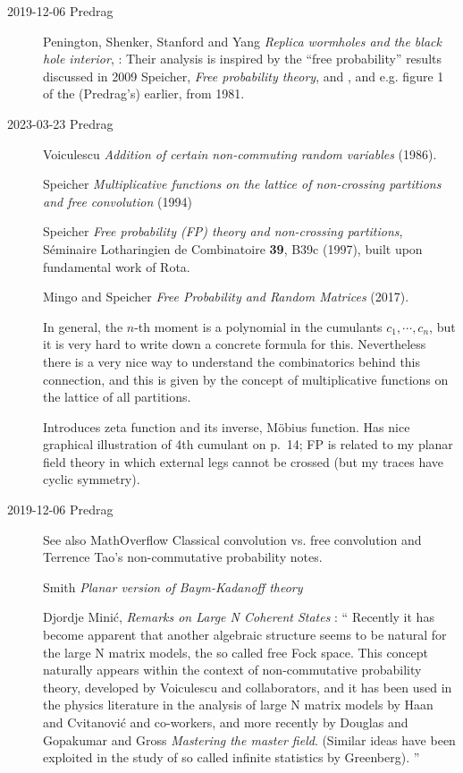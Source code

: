 \begin{description}
\item[2019-12-06 Predrag]
\label{post:PSSY19}
Penington, Shenker, Stanford and Yang
{\em Replica wormholes and the black hole interior},
:
Their analysis is inspired by the ``free probability'' results discussed
in 2009 Speicher, {\em Free probability theory},
 and , and e.g. figure 1 of the (Predrag's)
earlier, from 1981.

   \item[2023-03-23 Predrag]
Voiculescu
{\em Addition of certain non-commuting random variables} (1986).

Speicher {\em Multiplicative functions on the lattice of
non-crossing partitions and free convolution} (1994)

Speicher {\em Free probability (FP) theory and non-crossing partitions},
S{\'e}minaire Lotharingien de Combinatoire
     {{\bf 39}, B39c} (1997),
built upon fundamental work of Rota.

Mingo and Speicher
{\em Free Probability and Random Matrices} (2017).

In general, the $n$-th moment is a polynomial in the cumulants $c_1, \cdots ,
c_n$, but it is very hard to write down a concrete formula for this.
Nevertheless there is a very nice way to understand the combinatorics
behind this connection, and this is given by the concept of multiplicative
functions on the lattice of all partitions.

Introduces zeta function and its inverse, M{\"o}bius function. Has nice
graphical illustration of 4th cumulant on p.~14; FP is related to my planar
field theory in which external legs cannot be crossed (but my traces have
cyclic symmetry).


\item[2019-12-06 Predrag]
See also MathOverflow
{Classical convolution vs. free convolution}
and Terrence Tao's
{non-commutative probability} notes.

Smith {\em Planar version of {Baym-Kadanoff} theory}

Djordje Mini\'c, {\em Remarks on Large N Coherent States}
: `` Recently it has become apparent that another
algebraic structure seems to be natural for the large N matrix models,
the so called free Fock space. This concept naturally appears within the
context of non-commutative probability theory, developed by Voiculescu
and collaborators, and it has been used in the physics
literature in the analysis of large N matrix models by Haan and
Cvitanovi\'c and co-workers, and more recently by
Douglas and Gopakumar and Gross {\em Mastering
the master field}. (Similar ideas have been exploited in the study of so
called infinite statistics by Greenberg).
''


\end{description}
